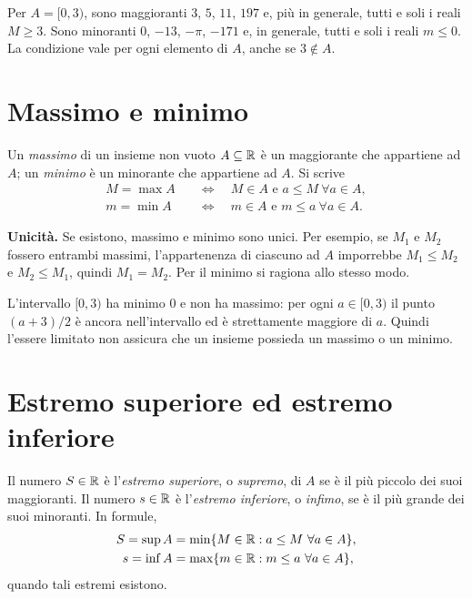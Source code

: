\begin{esempio}
Per $A=[0,3)$, sono maggioranti $3$, $5$, $11$, $197$ e, più in generale, tutti e soli i reali $M\ge3$. Sono minoranti $0$, $-13$, $-\pi$, $-171$ e, in generale, tutti e soli i reali $m\le0$. La condizione vale per ogni elemento di $A$, anche se $3\notin A$.
\end{esempio}

\section{Massimo e minimo}

\begin{definizione}
Un \emph{massimo} di un insieme non vuoto $A\subseteq\mathbb{R}$ è un maggiorante che appartiene ad $A$; un \emph{minimo} è un minorante che appartiene ad $A$. Si scrive
\begin{align*}
  M=\max A&\quad\Longleftrightarrow\quad
    M\in A\text{ e }a\le M\ \forall a\in A,\\
  m=\min A&\quad\Longleftrightarrow\quad
    m\in A\text{ e }m\le a\ \forall a\in A.
\end{align*}
\end{definizione}

\textbf{Unicità.} Se esistono, massimo e minimo sono unici. Per esempio, se $M_1$ e $M_2$ fossero entrambi massimi, l'appartenenza di ciascuno ad $A$ imporrebbe $M_1\le M_2$ e $M_2\le M_1$, quindi $M_1=M_2$. Per il minimo si ragiona allo stesso modo.

\begin{esempio}
L'intervallo $[0,3)$ ha minimo $0$ e non ha massimo: per ogni $a\in[0,3)$ il punto $(a+3)/2$ è ancora nell'intervallo ed è strettamente maggiore di $a$. Quindi l'essere limitato non assicura che un insieme possieda un massimo o un minimo.
\end{esempio}

\section{Estremo superiore ed estremo inferiore}

\begin{definizione}
Il numero $S\in\mathbb{R}$ è l'\emph{estremo superiore}, o \emph{supremo}, di $A$ se è il più piccolo dei suoi maggioranti. Il numero $s\in\mathbb{R}$ è l'\emph{estremo inferiore}, o \emph{infimo}, se è il più grande dei suoi minoranti. In formule,
\begin{align*}
  S=\sup A&=\min\{M\in\mathbb{R}:a\le M\ \forall a\in A\},\\
  s=\inf A&=\max\{m\in\mathbb{R}:m\le a\ \forall a\in A\},
\end{align*}
quando tali estremi esistono.
\end{definizione}

